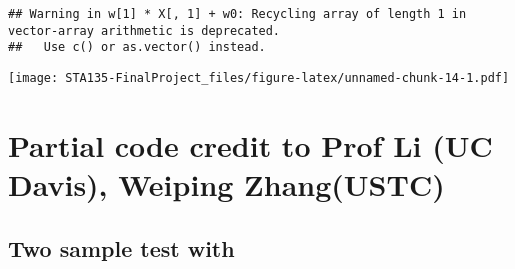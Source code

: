 \documentclass[]{article}
\newenvironment{Shaded}{\begin{snugshade}}{\end{snugshade}}
\newcommand{\CommentTok}[1]{\textcolor[rgb]{0.56,0.35,0.01}{\textit{#1}}}
\newcommand{\DataTypeTok}[1]{\textcolor[rgb]{0.13,0.29,0.53}{#1}}
\newcommand{\DecValTok}[1]{\textcolor[rgb]{0.00,0.00,0.81}{#1}}
\newcommand{\KeywordTok}[1]{\textcolor[rgb]{0.13,0.29,0.53}{\textbf{#1}}}
\newcommand{\NormalTok}[1]{#1}
\newcommand{\OperatorTok}[1]{\textcolor[rgb]{0.81,0.36,0.00}{\textbf{#1}}}
\newcommand{\StringTok}[1]{\textcolor[rgb]{0.31,0.60,0.02}{#1}}
\begin{document}
\begin{Shaded}
\end{Shaded}

\begin{verbatim}
## Warning in w[1] * X[, 1] + w0: Recycling array of length 1 in vector-array arithmetic is deprecated.
##   Use c() or as.vector() instead.
\end{verbatim}

\texttt{[image: STA135-FinalProject\_files/figure-latex/unnamed-chunk-14-1.pdf]}

\hypertarget{partial-code-credit-to-prof-li-uc-davis-weiping-zhangustc}{%
\section{Partial code credit to Prof Li (UC Davis), Weiping
Zhang(USTC)}\label{partial-code-credit-to-prof-li-uc-davis-weiping-zhangustc}}

\hypertarget{two-sample-test-with}{%
\subsection{Two sample test with}\label{two-sample-test-with}}
\end{document}
